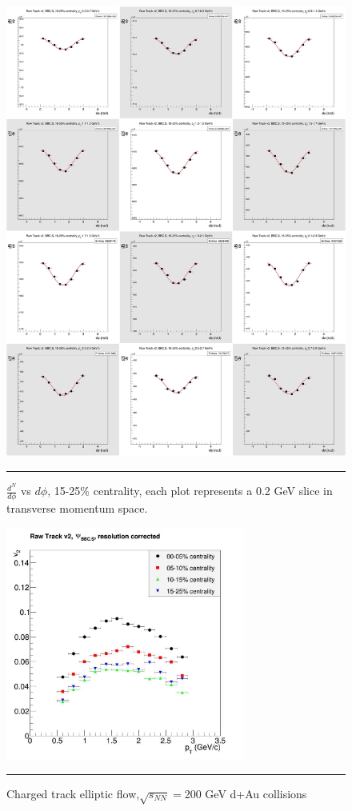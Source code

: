 \begin{figure}[htbp!]
  \centering
    \includegraphics[width=1\textwidth]{chargedtrackv2/htrkdphi2bbcs_3.jpg}
    \rule{35em}{0.5pt}
  \caption[$\frac{dN}{d\phi}$ vs $d\phi$, 15-25\% centrality.]{$\frac{d^N}{d\phi}$ vs $d\phi$, 15-25\% centrality, each plot represents a 0.2 GeV slice in transverse momentum space.}
  \label{fig:Ndphicent3}
\end{figure}

\begin{figure}[htbp!]
  \centering
    \includegraphics[width=0.7\textwidth]{chargedtrackv2/rawtrackv2_bbcNS.jpg}
    \rule{35em}{0.5pt}
  \caption[Charged track elliptic flow,$\sqrt{s_{NN}}=$200 GeV d+Au collisions]{Charged track elliptic flow,$\sqrt{s_{NN}}=$200 GeV d+Au collisions}
  \label{fig:alltrackv2}
\end{figure}
\clearpage
